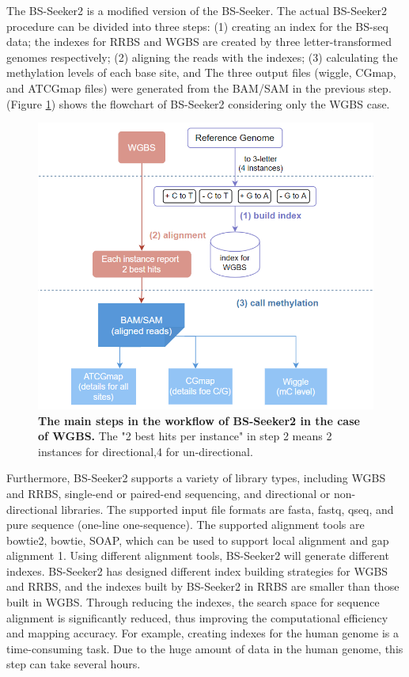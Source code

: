 \documentclass{PHlab-thesis}
\begin{document}
\par
The BS-Seeker2 is a modified version of the BS-Seeker. The actual BS-Seeker2 procedure can be divided into three steps: (1) creating an index for the BS-seq data; the indexes for RRBS and WGBS are created by three letter-transformed genomes respectively; (2) aligning the reads with the indexes; (3) calculating the methylation levels of each base site, and The three output files (wiggle, CGmap, and ATCGmap files) were generated from the BAM/SAM in the previous step. (Figure \ref{f2}) shows the flowchart of BS-Seeker2 considering only the WGBS case.

\begin{figure}[h!]
  \centering
  \includegraphics[scale=0.8]{figures/bs_seeker2_workflow.png}
  \caption{\textbf{The main steps in the workflow of BS-Seeker2 in the case of WGBS.}
  The "2 best hits per instance" in step 2 means 2 instances for directional,4 for un-directional.}
  \label{f2}
\end{figure}

\par
Furthermore, BS-Seeker2 supports a variety of library types, including WGBS and RRBS, single-end or paired-end sequencing, and directional or non-directional libraries. The supported input file formats are fasta, fastq, qseq, and pure sequence (one-line one-sequence). The supported alignment tools are bowtie2, bowtie, SOAP, which can be used to support local alignment and gap alignment {1}. Using different alignment tools, BS-Seeker2 will generate different indexes. BS-Seeker2 has designed different index building strategies for WGBS and RRBS, and the indexes built by BS-Seeker2 in RRBS are smaller than those built in WGBS. Through reducing the indexes, the search space for sequence alignment is significantly reduced, thus improving the computational efficiency and mapping accuracy. For example, creating indexes for the human genome is a time-consuming task. Due to the huge amount of data in the human genome, this step can take several hours.
\end{document}
